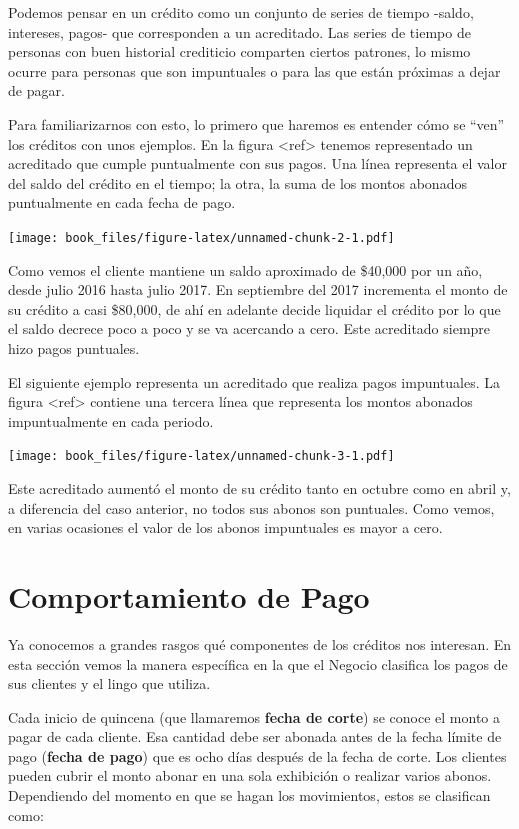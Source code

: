 \documentclass[]{book}
\begin{document}
Podemos pensar en un crédito como un conjunto de series de tiempo -saldo, intereses, pagos- que corresponden a un acreditado. Las series de tiempo de personas con buen historial crediticio comparten ciertos patrones, lo mismo ocurre para personas que son impuntuales o para las que están próximas a dejar de pagar.

Para familiarizarnos con esto, lo primero que haremos es entender cómo se ``ven'' los créditos con unos ejemplos. En la figura \textless{}ref\textgreater{} tenemos representado un acreditado que cumple puntualmente con sus pagos. Una línea representa el valor del saldo del crédito en el tiempo; la otra, la suma de los montos abonados puntualmente en cada fecha de pago.

\texttt{[image: book\_files/figure-latex/unnamed-chunk-2-1.pdf]}

Como vemos el cliente mantiene un saldo aproximado de \$40,000 por un año, desde julio 2016 hasta julio 2017. En septiembre del 2017 incrementa el monto de su crédito a casi \$80,000, de ahí en adelante decide liquidar el crédito por lo que el saldo decrece poco a poco y se va acercando a cero. Este acreditado siempre hizo pagos puntuales.

El siguiente ejemplo representa un acreditado que realiza pagos impuntuales. La figura \textless{}ref\textgreater{} contiene una tercera línea que representa los montos abonados impuntualmente en cada periodo.

\texttt{[image: book\_files/figure-latex/unnamed-chunk-3-1.pdf]}

Este acreditado aumentó el monto de su crédito tanto en octubre como en abril y, a diferencia del caso anterior, no todos sus abonos son puntuales. Como vemos, en varias ocasiones el valor de los abonos impuntuales es mayor a cero.

\hypertarget{comportamiento-de-pago}{%
\section{Comportamiento de Pago}\label{comportamiento-de-pago}}

Ya conocemos a grandes rasgos qué componentes de los créditos nos interesan. En esta sección vemos la manera específica en la que el Negocio clasifica los pagos de sus clientes y el lingo que utiliza.

Cada inicio de quincena (que llamaremos \textbf{fecha de corte}) se conoce el monto a pagar de cada cliente. Esa cantidad debe ser abonada antes de la fecha límite de pago (\textbf{fecha de pago}) que es ocho días después de la fecha de corte. Los clientes pueden cubrir el monto abonar en una sola exhibición o realizar varios abonos. Dependiendo del momento en que se hagan los movimientos, estos se clasifican como:
\end{document}
